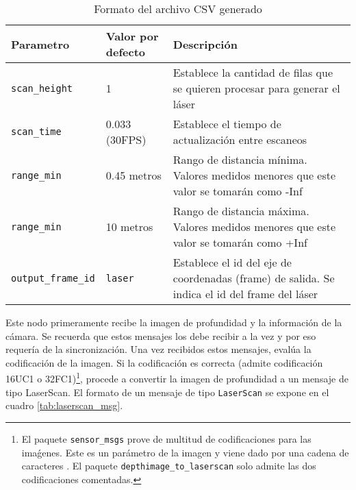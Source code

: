 \begin{table}[H]
\begin{center}
\begin{tabular}{| w{c}{3cm} | w{c}{3cm} | m{7.5cm} |}
	\hline
	Parametro & Valor por defecto & Descripción \\ \hline
	\texttt{scan\_height} & 1 & Establece la cantidad de filas que se quieren procesar para generar el láser \\ \hline
	\texttt{scan\_time} & 0.033 (30FPS) & Establece el tiempo de actualización entre escaneos \\ \hline
	\texttt{range\_min} & 0.45 metros & Rango de distancia mínima. Valores medidos menores que este valor se tomarán como -Inf \\ \hline
	\texttt{range\_min} & 10 metros & Rango de distancia máxima. Valores medidos menores que este valor se tomarán como +Inf \\ \hline
	\texttt{output\_frame\_id} & \texttt{laser} & Establece el id del eje de coordenadas (frame) de salida. Se indica el id del frame del láser \\ \hline
\end{tabular}
\caption{Formato del archivo CSV generado}
\label{tab:param_depthimage}
\end{center}
\end{table} 

Este nodo primeramente recibe la imagen de profundidad y la información de la cámara. Se recuerda que estos mensajes los debe recibir a la vez y por eso requería de la sincronización. Una vez recibidos estos mensajes, evalúa la codificación de la imagen. Si la codificación es correcta (admite codificación 16UC1 o 32FC1)\footnote{El paquete \texttt{sensor\_msgs} prove de multitud de codificaciones para las imaǵenes. Este es un parámetro de la imagen y viene dado por una cadena de caracteres \cite{enc}. El paquete \texttt{depthimage\_to\_laserscan} solo admite las dos codificaciones comentadas.}, procede a convertir la imagen de profundidad a un mensaje de tipo LaserScan. El formato de un mensaje de tipo \texttt{LaserScan} se expone en el cuadro \ref{tab:laserscan_msg}.\\

